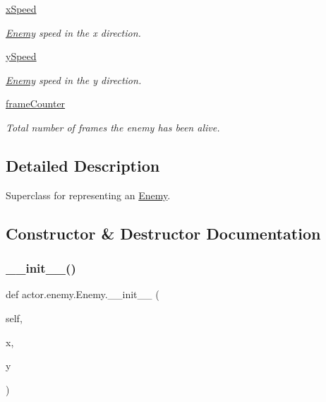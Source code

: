 \begin{DoxyCompactItemize}
\hyperlink{classactor_1_1enemy_1_1_enemy_aeb8e66f955c0233222186a0b31ffebec}{x\+Speed}
\begin{DoxyCompactList}\small\item\em \hyperlink{classactor_1_1enemy_1_1_enemy}{Enemy} speed in the x direction. \end{DoxyCompactList}\item 
\mbox{\label{classactor_1_1enemy_1_1_enemy_a9df94b7c1824222274977377fc61de0b}} 
\hyperlink{classactor_1_1enemy_1_1_enemy_a9df94b7c1824222274977377fc61de0b}{y\+Speed}
\begin{DoxyCompactList}\small\item\em \hyperlink{classactor_1_1enemy_1_1_enemy}{Enemy} speed in the y direction. \end{DoxyCompactList}\item 
\mbox{\label{classactor_1_1enemy_1_1_enemy_a2c89ef588742abcdeb22215bb381d69b}} 
\hyperlink{classactor_1_1enemy_1_1_enemy_a2c89ef588742abcdeb22215bb381d69b}{frame\+Counter}
\begin{DoxyCompactList}\small\item\em Total number of frames the enemy has been alive. \end{DoxyCompactList}\end{DoxyCompactItemize}


\subsection{Detailed Description}
Superclass for representing an \hyperlink{classactor_1_1enemy_1_1_enemy}{Enemy}. 

\subsection{Constructor \& Destructor Documentation}
\mbox{\label{classactor_1_1enemy_1_1_enemy_a6924d71617a5022d67fd46b36141dfd2}} 
\subsubsection{\texorpdfstring{\+\_\+\+\_\+init\+\_\+\+\_\+()}{\_\_init\_\_()}}
{\footnotesize\ttfamily def actor.\+enemy.\+Enemy.\+\_\+\+\_\+init\+\_\+\+\_\+ (\begin{DoxyParamCaption}\item[{}]{self,  }\item[{}]{x,  }\item[{}]{y }\end{DoxyParamCaption})}



